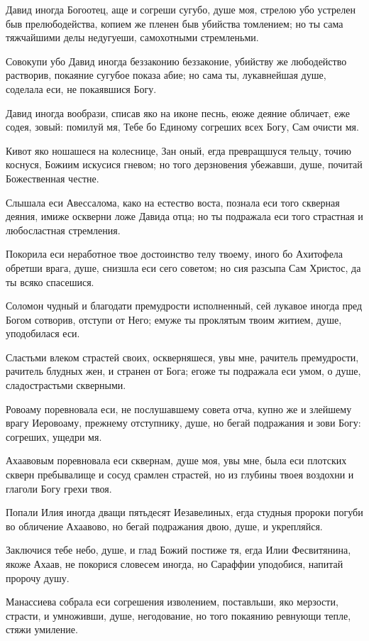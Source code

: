 Давид иногда Богоотец, аще и согреши сугубо, душе моя, стрелою убо устрелен быв прелюбодейства, копием же пленен быв убийства томлением; но ты сама тяжчайшими делы недугуеши, самохотными стремленьми.

Совокупи убо Давид иногда беззаконию беззаконие, убийству же любодейство растворив, покаяние сугубое показа абие; но сама ты, лукавнейшая душе, соделала еси, не покаявшися Богу.

Давид иногда вообрази, списав яко на иконе песнь, еюже деяние обличает, еже содея, зовый: помилуй мя, Тебе бо Единому согреших всех Богу, Сам очисти мя.

Кивот яко ношашеся на колеснице, Зан оный, егда превращшуся тельцу, точию коснуся, Божиим искусися гневом; но того дерзновения убежавши, душе, почитай Божественная честне.

Слышала еси Авессалома, како на естество воста, познала еси того скверная деяния, имиже оскверни ложе Давида отца; но ты подражала еси того страстная и любосластная стремления.

Покорила еси неработное твое достоинство телу твоему, иного бо Ахитофела обретши врага, душе, снизшла еси сего советом; но сия разсыпа Сам Христос, да ты всяко спасешися.

Соломон чудный и благодати премудрости исполненный, сей лукавое иногда пред Богом сотворив, отступи от Него; емуже ты проклятым твоим житием, душе, уподобилася еси.

Сластьми влеком страстей своих, оскверняшеся, увы мне, рачитель премудрости, рачитель блудных жен, и странен от Бога; егоже ты подражала еси умом, о душе, сладострастьми скверными.

Ровоаму поревновала еси, не послушавшему совета отча, купно же и злейшему врагу Иеровоаму, прежнему отступнику, душе, но бегай подражания и зови Богу: согреших, ущедри мя.

Ахаавовым поревновала еси сквернам, душе моя, увы мне, была еси плотских скверн пребывалище и сосуд срамлен страстей, но из глубины твоея воздохни и глаголи Богу грехи твоя.

Попали Илия иногда дващи пятьдесят Иезавелиных, егда студныя пророки погуби во обличение Ахаавово, но бегай подражания двою, душе, и укрепляйся.

Заключися тебе небо, душе, и глад Божий постиже тя, егда Илии Фесвитянина, якоже Ахаав, не покорися словесем иногда, но Сараффии уподобися, напитай пророчу душу.

Манассиева собрала еси согрешения изволением, поставльши, яко мерзости, страсти, и умноживши, душе, негодование, но того покаянию ревнующи тепле, стяжи умиление.

